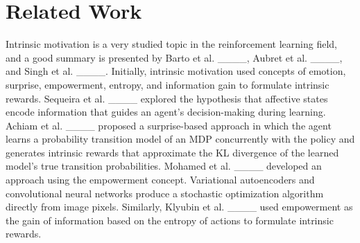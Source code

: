 \section{Related Work}
\label{sec:related_work}



Intrinsic motivation is a very studied topic in the reinforcement learning field, and a good summary is presented by Barto et al. ____, Aubret et al. ____, and Singh et al. ____. Initially, intrinsic motivation used concepts of emotion, surprise, empowerment, entropy, and information gain to formulate intrinsic rewards. Sequeira et al. ____ explored the hypothesis that affective states encode information that guides an agent's decision-making during learning. Achiam et al. ____ proposed a surprise-based approach in which the agent learns a probability transition model of an MDP concurrently with the policy and generates intrinsic rewards that approximate the KL divergence of the learned model's true transition probabilities. Mohamed et al. ____ developed an approach using the empowerment concept. Variational autoencoders and convolutional neural networks produce a stochastic optimization algorithm directly from image pixels. Similarly, Klyubin et al. ____ used empowerment as the gain of information based on the entropy of actions to formulate intrinsic rewards.



